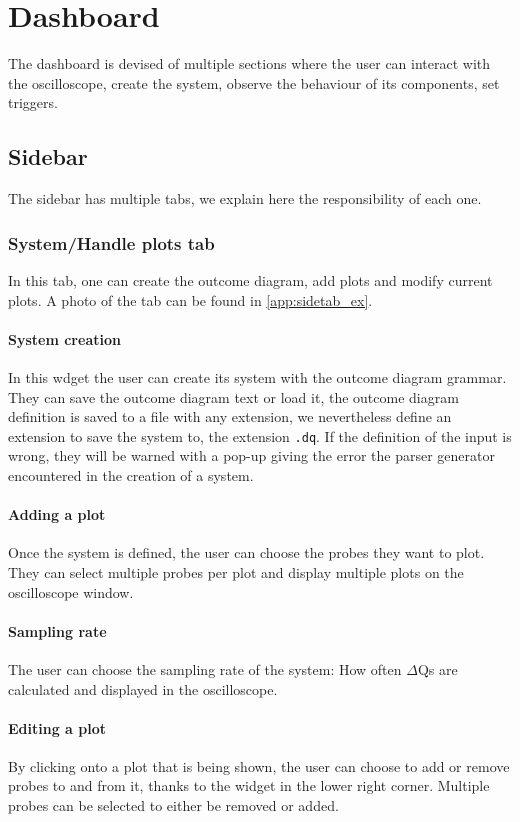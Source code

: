 \section{Dashboard}
    The dashboard is devised of multiple sections where the user can interact with the oscilloscope, create the system, observe the behaviour of its components, set triggers.

    \subsection{Sidebar}
        The sidebar has multiple tabs, we explain here the responsibility of each one.

    \subsubsection{System/Handle plots tab}
        In this tab, one can create the outcome diagram, add plots and modify current plots. A photo of the tab can be found in \cref{app:sidetab_ex}.
    \paragraph{System creation}
        In this wdget the user can create its system with the outcome diagram grammar. They can save the outcome diagram text or load it, the outcome diagram definition is saved to a file with any extension, we nevertheless define an extension to save the system to, the extension \texttt{.dq}.
        If the definition of the input is wrong, they will be warned with a pop-up giving the error the parser generator encountered in the creation of a system.

    \paragraph{Adding a plot}
        Once the system is defined, the user can choose the probes they want to plot. They can select multiple probes per plot and display multiple plots on the oscilloscope window.
    
    \paragraph{Sampling rate}
        The user can choose the sampling rate of the system: How often $\Delta$Qs are calculated and displayed in the oscilloscope.

    \paragraph{Editing a plot}
        By clicking onto a plot that is being shown, the user can choose to add or remove probes to and from it, thanks to the widget in the lower right corner. Multiple probes can be selected to either be removed or added.

